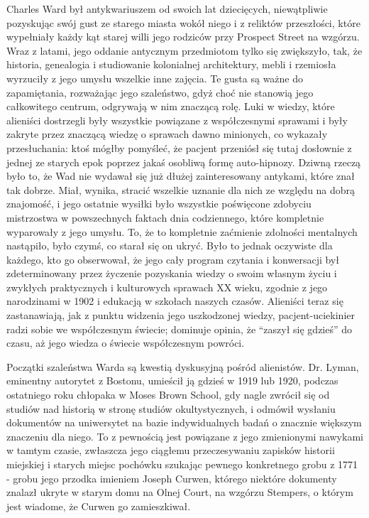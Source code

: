 Charles Ward był antykwariuszem od swoich lat dziecięcych, niewątpliwie pozyskując swój gust ze starego miasta wokół niego i z reliktów przeszłości, które wypełniały każdy kąt starej willi jego rodziców przy Prospect Street na wzgórzu. Wraz z latami, jego oddanie antycznym przedmiotom tylko się zwiększyło, tak, że historia, genealogia i studiowanie kolonialnej architektury, mebli i rzemiosła wyrzuciły z jego umysłu wszelkie inne zajęcia. Te gusta są ważne do zapamiętania, rozważając jego szaleństwo, gdyż choć nie stanowią jego całkowitego centrum, odgrywają w nim znaczącą rolę. Luki w wiedzy, które alieniści dostrzegli były wszystkie powiązane z współczesnymi sprawami i były zakryte przez znaczącą wiedzę o sprawach dawno minionych, co wykazały przesłuchania: ktoś mógłby pomyśleć, że pacjent przeniósł się tutaj dosłownie z jednej ze starych epok poprzez jakaś osobliwą formę auto-hipnozy. Dziwną rzeczą było to, że Wad nie wydawał się już dłużej zainteresowany antykami, które znał tak dobrze. Miał, wynika, stracić wszelkie uznanie dla nich ze względu na dobrą znajomość, i jego ostatnie wysiłki było wszystkie poświęcone zdobyciu mistrzostwa w powszechnych faktach dnia codziennego, które kompletnie wyparowały z jego umysłu. To, że to kompletnie zaćmienie zdolności mentalnych nastąpiło, było czymś, co starał się on ukryć. Było to jednak oczywiste dla każdego, kto go obserwował, że jego cały program czytania i konwersacji był zdeterminowany przez życzenie pozyskania wiedzy o swoim własnym życiu i zwykłych praktycznych i kulturowych sprawach XX wieku, zgodnie z jego narodzinami w 1902 i edukacją w szkołach naszych czasów. Alieniści teraz się zastanawiają, jak z punktu widzenia jego uszkodzonej wiedzy, pacjent-uciekinier radzi sobie we współczesnym świecie; dominuje opinia, że ``zaszył się gdzieś'' do czasu, aż jego wiedza o świecie współczesnym powróci.

Początki szaleństwa Warda są kwestią dyskusyjną pośród alienistów. Dr. Lyman, eminentny autorytet z Bostonu, umieścił ją gdzieś w 1919 lub 1920, podczas ostatniego roku chłopaka w Moses Brown School, gdy nagle zwrócił się od studiów nad historią w stronę studiów okultystycznych, i odmówił wysłaniu dokumentów na uniwersytet na bazie indywidualnych badań o znacznie większym znaczeniu dla niego. To z pewnością jest powiązane z jego zmienionymi nawykami w tamtym czasie, zwłaszcza jego ciągłemu przeczesywaniu zapisków historii miejskiej i starych miejsc pochówku szukając pewnego konkretnego grobu z 1771 - grobu jego przodka imieniem Joseph Curwen, którego niektóre dokumenty znalazł ukryte w starym domu na Olnej Court, na wzgórzu Stempers, o którym jest wiadome, że Curwen go zamieszkiwał. 

